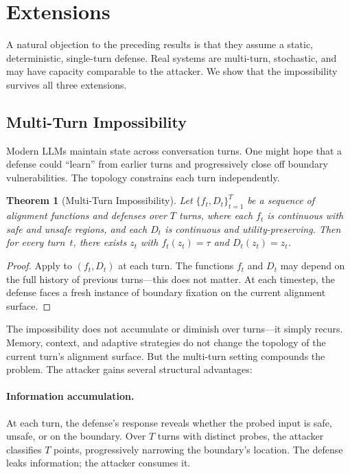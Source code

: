 \documentclass[11pt]{article}
\newtheorem{theorem}{Theorem}[section]
\begin{document}
\section{Extensions}
\label{sec:extensions}

A natural objection to the preceding results is that they assume a
static, deterministic, single-turn defense. Real systems are multi-turn,
stochastic, and may have capacity comparable to the attacker. We show
that the impossibility survives all three extensions.

\subsection{Multi-Turn Impossibility}

Modern LLMs maintain state across conversation turns. One might hope
that a defense could ``learn'' from earlier turns and progressively
close off boundary vulnerabilities. The topology constrains each turn
independently.

\begin{theorem}[Multi-Turn Impossibility]
\label{thm:multi-turn}
Let $\{f_t, D_t\}_{t=1}^T$ be a sequence of alignment functions and
defenses over $T$ turns, where each $f_t$ is continuous with safe and
unsafe regions, and each $D_t$ is continuous and utility-preserving.
Then for \emph{every} turn~$t$, there exists $z_t$ with
$f_t(z_t) = \tau$ and $D_t(z_t) = z_t$.
\end{theorem}

\begin{proof}
Apply  to $(f_t, D_t)$ at each turn. The functions
$f_t$ and $D_t$ may depend on the full history of previous turns---this
does not matter. At each timestep, the defense faces a fresh instance
of boundary fixation on the current alignment surface.
\end{proof}

The impossibility does not accumulate or diminish over turns---it simply
recurs. Memory, context, and adaptive strategies do not change the
topology of the current turn's alignment surface. But the multi-turn
setting compounds the problem. The attacker gains
several structural advantages:

\paragraph{Information accumulation.}
At each turn, the defense's response reveals whether the probed input
is safe, unsafe, or on the boundary. Over $T$ turns with distinct
probes, the attacker classifies $T$ points, progressively narrowing the
boundary's location. The defense leaks information; the attacker
consumes it.
\end{document}
